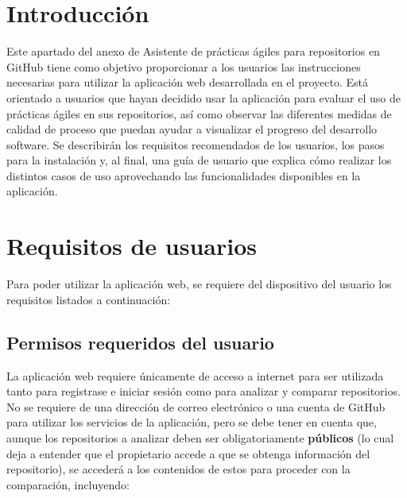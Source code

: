 
\section{Introducción}
Este apartado del anexo de Asistente de prácticas ágiles para repositorios en GitHub tiene como objetivo proporcionar a los usuarios las instrucciones necesarias para utilizar la aplicación web desarrollada en el proyecto. 
Está orientado a usuarios que hayan decidido usar la aplicación para evaluar el uso de prácticas ágiles en sus repositorios, así como observar las diferentes medidas de calidad de proceso que puedan ayudar a visualizar el progreso del desarrollo software.
Se describirán los requisitos recomendados de los usuarios, los pasos para la instalación y, al final, una guía de usuario que explica cómo realizar los distintos casos de uso aprovechando las funcionalidades disponibles en la aplicación.

\section{Requisitos de usuarios}
Para poder utilizar la aplicación web, se requiere del dispositivo del usuario los requisitos listados a continuación:

\subsection*{Permisos requeridos del usuario}
La aplicación web requiere únicamente de acceso a internet para ser utilizada tanto para registrase e iniciar sesión como para analizar y comparar repositorios.
No se requiere de una dirección de correo electrónico o una cuenta de GitHub para utilizar los servicios de la aplicación, pero se debe tener en cuenta que, aunque los repositorios a analizar deben ser obligatoriamente \textbf{públicos} (lo cual deja a entender que el propietario accede a que se obtenga información del repositorio), se accederá a los contenidos de estos para proceder con la comparación, incluyendo:

